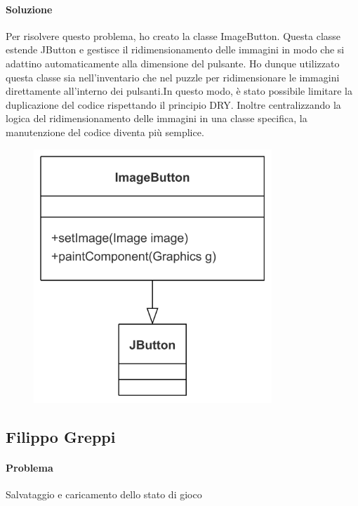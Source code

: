 \documentclass[a4paper,12pt]{report}
\begin{document}
\paragraph{Soluzione}Per risolvere questo problema, ho creato la classe ImageButton. Questa classe estende JButton e gestisce il ridimensionamento delle immagini in modo che si adattino automaticamente alla dimensione del pulsante. Ho dunque utilizzato questa classe sia nell'inventario che nel puzzle per ridimensionare le immagini direttamente all'interno dei pulsanti.In questo modo, è stato possibile limitare la duplicazione del codice rispettando il principio DRY. Inoltre centralizzando la logica del ridimensionamento delle immagini in una classe specifica, la manutenzione del codice diventa più semplice. 
\begin{figure}[h]  %
    \centering
    \includegraphics[width=0.8\textwidth]{img/button.png}  %
    \label{img:gameObject}
\end{figure}
%
\subsection{Filippo Greppi}
%
%
\paragraph{Problema} Salvataggio e caricamento dello stato di gioco
\end{document}
